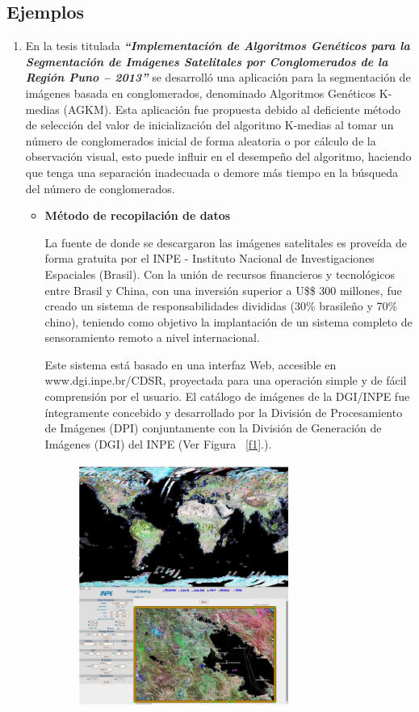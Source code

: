 \documentclass[10pt,journal]{IEEEtran}
\begin{document}
\subsection{\textbf{Ejemplos}} 
\begin{enumerate}
\item 
En la tesis titulada \textit{\textbf{“Implementación de Algoritmos Genéticos para la Segmentación de Imágenes Satelitales por Conglomerados de la Región Puno – 2013”}} \citep{apaza} se desarrolló una aplicación para la segmentación de imágenes basada en conglomerados, denominado Algoritmos Genéticos K-medias (AGKM). Esta aplicación fue propuesta debido al deficiente método de selección del valor de inicialización del algoritmo K-medias al tomar un número de conglomerados inicial de forma aleatoria o por cálculo de la observación visual, esto puede influir en el desempeño del algoritmo, haciendo que tenga una separación inadecuada o demore más tiempo en la búsqueda del número de conglomerados.
\begin{itemize}
    \item {\textbf{Método de recopilación de datos}}\par
    La fuente de donde se descargaron las imágenes satelitales es proveída de forma gratuita por el INPE - Instituto Nacional de Investigaciones Espaciales (Brasil). Con la unión de recursos financieros y tecnológicos entre Brasil y China, con una inversión superior a U\$\$ 300 millones, fue creado un sistema de responsabilidades divididas (30\% brasileño y 70\% chino), teniendo como objetivo la implantación de un sistema completo de sensoramiento remoto a nivel internacional.\par
    Este sistema está basado en una interfaz Web, accesible en www.dgi.inpe.br/CDSR, proyectada para una operación simple y de fácil comprensión por el usuario. El catálogo de imágenes de la DGI/INPE fue íntegramente concebido y desarrollado por la División de Procesamiento de Imágenes (DPI) conjuntamente con la División de Generación de Imágenes (DGI) del INPE (Ver Figura ~\ref{f1}.).
    \begin{figure}[H]
        \begin{center}
            \includegraphics[width=7cm, height=8cm]{figuras/1.JPG}

\end{center}
\end{figure}
\end{itemize}
\end{enumerate}
\end{document}
